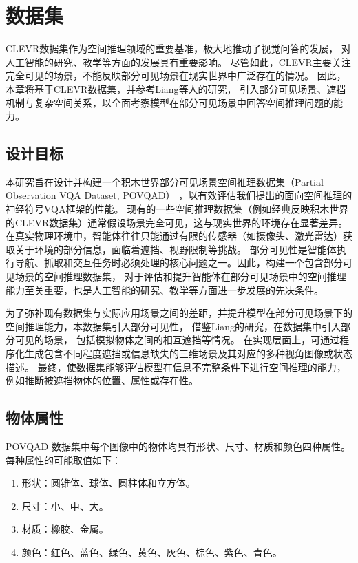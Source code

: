 \chapter{数据集}\label{dataset}
CLEVR数据集作为空间推理领域的重要基准，极大地推动了视觉问答的发展，
对人工智能的研究、教学等方面的发展具有重要影响。
尽管如此，CLEVR主要关注完全可见的场景，不能反映部分可见场景在现实世界中广泛存在的情况。
因此，本章将基于CLEVR数据集，并参考Liang\cite{liang2022visualabductivereasoning}等人的研究，
引入部分可见场景、遮挡机制与复杂空间关系，以全面考察模型在部分可见场景中回答空间推理问题的能力。

\section{设计目标}
本研究旨在设计并构建一个积木世界部分可见场景空间推理数据集（Partial Observation VQA Dataset, POVQAD）
，以有效评估我们提出的面向空间推理的神经符号VQA框架的性能。
现有的一些空间推理数据集（例如经典反映积木世界的CLEVR数据集）通常假设场景完全可见，这与现实世界的环境存在显著差异。
在真实物理环境中，智能体往往只能通过有限的传感器（如摄像头、激光雷达）获取关于环境的部分信息，面临着遮挡、视野限制等挑战。
部分可见性是智能体执行导航、抓取和交互任务时必须处理的核心问题之一。因此，构建一个包含部分可见场景的空间推理数据集，
对于评估和提升智能体在部分可见场景中的空间推理能力至关重要，也是人工智能的研究、教学等方面进一步发展的先决条件。

为了弥补现有数据集与实际应用场景之间的差距，并提升模型在部分可见场景下的空间推理能力，本数据集引入部分可见性，
借鉴Liang\cite{liang2022visualabductivereasoning}的研究，在数据集中引入部分可见的场景，
包括模拟物体之间的相互遮挡等情况。
在实现层面上，可通过程序化生成包含不同程度遮挡或信息缺失的三维场景及其对应的多种视角图像或状态描述。
最终，使数据集能够评估模型在信息不完整条件下进行空间推理的能力，例如推断被遮挡物体的位置、属性或存在性。

\section{物体属性}
POVQAD 数据集中每个图像中的物体均具有形状、尺寸、材质和颜色四种属性。每种属性的可能取值如下：
\begin{enumerate}[label=(\arabic*),itemsep=0pt,parsep=0pt]
    \item 形状：圆锥体、球体、圆柱体和立方体。
    \item 尺寸：小、中、大。
    \item 材质：橡胶、金属。
    \item 颜色：红色、蓝色、绿色、黄色、灰色、棕色、紫色、青色。
\end{enumerate}

